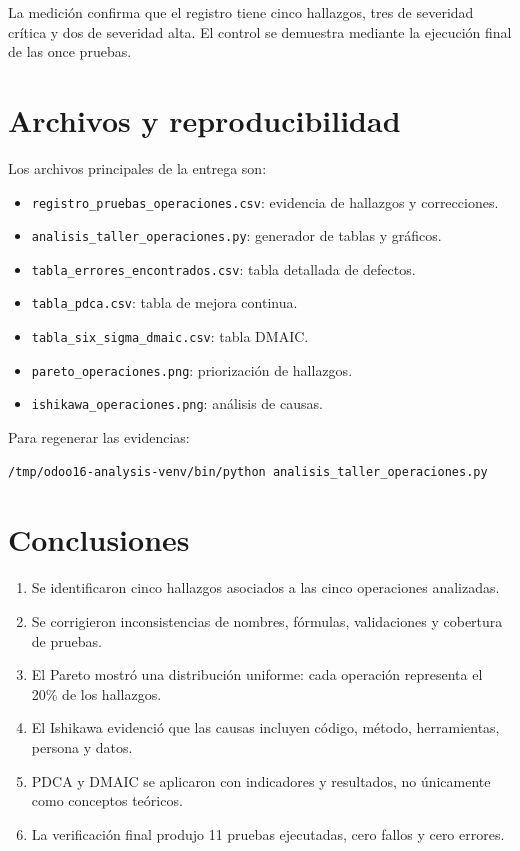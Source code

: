 \documentclass{article}
\begin{document}
La medición confirma que el registro tiene cinco hallazgos, tres de severidad crítica y dos de severidad alta. El control se demuestra mediante la ejecución final de las once pruebas.

\section{Archivos y reproducibilidad}
Los archivos principales de la entrega son:
\begin{itemize}[leftmargin=*]
  \item \texttt{registro\_pruebas\_operaciones.csv}: evidencia de hallazgos y correcciones.
  \item \texttt{analisis\_taller\_operaciones.py}: generador de tablas y gráficos.
  \item \texttt{tabla\_errores\_encontrados.csv}: tabla detallada de defectos.
  \item \texttt{tabla\_pdca.csv}: tabla de mejora continua.
  \item \texttt{tabla\_six\_sigma\_dmaic.csv}: tabla DMAIC.
  \item \texttt{pareto\_operaciones.png}: priorización de hallazgos.
  \item \texttt{ishikawa\_operaciones.png}: análisis de causas.
\end{itemize}

Para regenerar las evidencias:
\begin{lstlisting}[language=bash]
/tmp/odoo16-analysis-venv/bin/python analisis_taller_operaciones.py
\end{lstlisting}

\section{Conclusiones}
\begin{enumerate}[leftmargin=*]
  \item Se identificaron cinco hallazgos asociados a las cinco operaciones analizadas.
  \item Se corrigieron inconsistencias de nombres, fórmulas, validaciones y cobertura de pruebas.
  \item El Pareto mostró una distribución uniforme: cada operación representa el 20\% de los hallazgos.
  \item El Ishikawa evidenció que las causas incluyen código, método, herramientas, persona y datos.
  \item PDCA y DMAIC se aplicaron con indicadores y resultados, no únicamente como conceptos teóricos.
  \item La verificación final produjo 11 pruebas ejecutadas, cero fallos y cero errores.
\end{enumerate}
\end{document}
